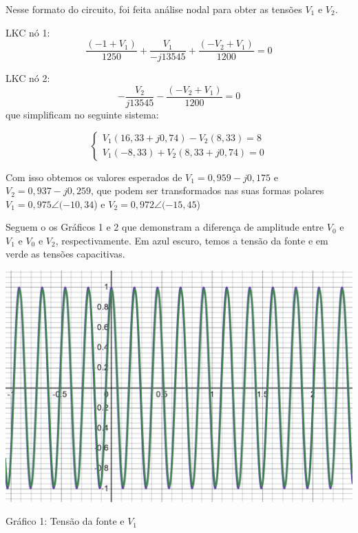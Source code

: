\documentclass[a4 paper]{article}
\begin{document}
Nesse formato do circuito, foi feita análise nodal para obter as tensões $V_1$ e $V_2$.

\newpage
LKC nó 1:
\[\frac{(-1+V_1)}{1250}+\frac{V_1}{-j13545}+\frac{(-V_2+V_1)}{1200}=0\]

LKC nó 2:
\[-\frac{V_2}{j13545}-\frac{(-V_2+V_1)}{1200}=0\]
que simplificam no seguinte sistema:

\begin{equation*}
\left\{
\begin{aligned}
V_1(16,33+j0,74)-V_2(8,33)=8\\
V_1(-8,33)+V_2(8,33+j0,74)=0
\end{aligned}\right.
\end{equation*}

Com isso obtemos os valores esperados de $V_1=0,959-j0,175$ e $V_2=0,937-j0,259$, que podem ser transformados nas suas formas polares $V_1=0,975\angle(-10,34$\textdegree) e $V_2=0,972\angle(-15,45$\textdegree)

Seguem o os Gráficos 1 e 2 que demonstram a diferença de amplitude entre $V_0$ e $V_1$ e $V_0$ e $V_2$, respectivamente. Em azul escuro, temos a tensão da fonte e em verde as tensões capacitivas.

\begin{table}[h]
\centering
\includegraphics[scale=0.225]{rgadicoas/grafico1}
\end{table}

\begin{center}
Gráfico 1: Tensão da fonte e $V_1$
\end{center}
\end{document}
